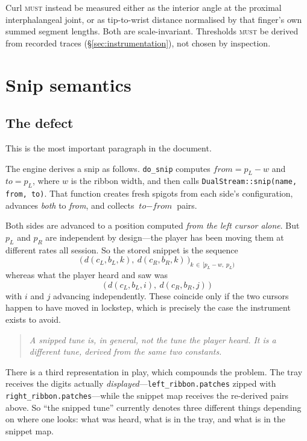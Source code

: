\documentclass[11pt,a4paper]{article}
\newcommand{\MUST}{\textsc{must}}
\theoremstyle{definition}
\theoremstyle{plain}
\theoremstyle{remark}
\begin{document}
Curl \MUST{} instead be measured either as the interior angle at the proximal interphalangeal
joint, or as tip-to-wrist distance normalised by that finger's own summed segment lengths. Both are
scale-invariant. Thresholds \MUST{} be derived from recorded traces (\S\ref{sec:instrumentation}),
not chosen by inspection.

\section{Snip semantics}
\label{sec:snip}

\subsection{The defect}

This is the most important paragraph in the document.

The engine derives a snip as follows. \texttt{do\_snip} computes
$\textit{from} = p_L - w$ and $\textit{to} = p_L$, where $w$ is the ribbon width, and then calls
\texttt{DualStream::snip(name, from, to)}. That function creates fresh spigots from each side's
configuration, advances \emph{both} to \textit{from}, and collects $\textit{to}-\textit{from}$
pairs.

Both sides are advanced to a position computed \emph{from the left cursor alone}. But $p_L$ and
$p_R$ are independent by design---the player has been moving them at different rates all session.
So the stored snippet is the sequence
\[
\big(\, d(c_L, b_L, k),\ d(c_R, b_R, k) \,\big)_{k \,\in\, [p_L - w,\; p_L)}
\]
whereas what the player heard and saw was
\[
\big(\, d(c_L, b_L, i),\ d(c_R, b_R, j) \,\big)
\]
with $i$ and $j$ advancing independently. These coincide only if the two cursors happen to have
moved in lockstep, which is precisely the case the instrument exists to avoid.

\begin{quote}\itshape
A snipped tune is, in general, not the tune the player heard. It is a different tune, derived from
the same two constants.
\end{quote}

There is a third representation in play, which compounds the problem. The tray receives the
digits actually \emph{displayed}---\texttt{left\_ribbon.patches} zipped with
\texttt{right\_ribbon.patches}---while the snippet map receives the re-derived pairs above. So
``the snipped tune'' currently denotes three different things depending on where one looks: what
was heard, what is in the tray, and what is in the snippet map.
\end{document}

